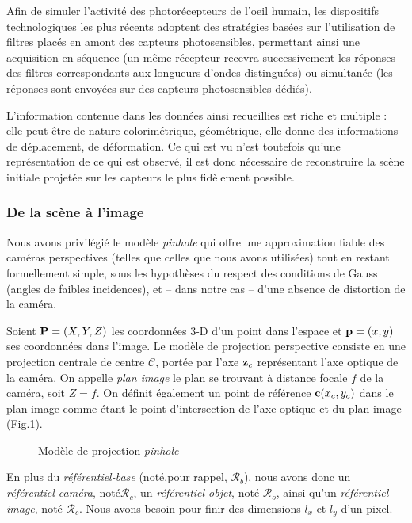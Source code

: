  Afin de simuler l'activité des photorécepteurs de l'oeil humain, les dispositifs technologiques les plus récents adoptent des stratégies basées sur l'utilisation de filtres placés en amont des capteurs photosensibles, permettant ainsi une acquisition en séquence (un même récepteur recevra successivement les réponses des filtres correspondants aux longueurs d'ondes distinguées) ou simultanée (les réponses sont envoyées sur des capteurs photosensibles dédiés).
  
 
L'information contenue dans les données ainsi recueillies est riche et multiple : elle peut-être de nature colorimétrique, géométrique, elle donne des informations de déplacement, de déformation. Ce qui est vu n'est toutefois qu'une représentation de ce qui est observé, il est donc nécessaire de reconstruire la scène initiale projetée sur les capteurs le plus fidèlement possible.
 
\subsubsection{De la scène à l'image}
 
Nous avons privilégié le modèle {\it pinhole} qui offre une approximation fiable des caméras perspectives (telles que celles que nous avons utilisées) tout en restant formellement simple, \cite{Faugeras:1993} sous les hypothèses du respect des conditions de Gauss (angles de faibles incidences), et -- dans notre cas -- d'une absence de distortion de la caméra.

Soient ${\bf P} = (X, Y, Z)$ les coordonnées 3-D d'un point dans l'espace et ${\bf p} = (x, y)$ ses coordonnées dans l'image. Le modèle de projection perspective consiste en une projection centrale de centre $\mathcal C$, portée par l'axe ${\bf z}_c$ représentant l'axe optique de la caméra. On appelle {\it plan image} le plan se trouvant à distance focale $f$ de la caméra, soit $Z = f$. On définit également un point de référence ${\bf c}(x_c,y_c)$ dans le plan image comme étant le point d'intersection de l'axe optique et du plan image (Fig.\ref{intro:fig12}).

\begin{figure}[h!tp]
  \centering
  \def\svgwidth{.95\linewidth}
  
    \caption{\footnotesize{Modèle de projection {\it pinhole}}}
\label{intro:fig12}
\end{figure}

En plus du {\it référentiel-base} (noté,pour rappel, $\mathcal R_b$), nous avons donc un {\it référentiel-caméra}, noté$\mathcal R_c$, un {\it référentiel-objet}, noté $\mathcal R_o$, ainsi qu'un {\it référentiel-image}, noté $\mathcal R_c$. Nous avons besoin pour finir des dimensions $l_x$ et $l_y$ d'un pixel.

